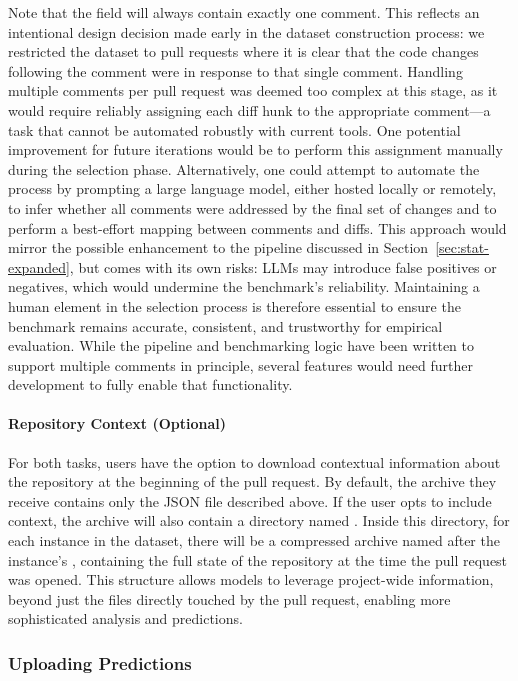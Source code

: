 Note that the  field will always contain exactly one comment. This reflects an
intentional design decision made early in the dataset construction process: we restricted the
dataset to pull requests where it is clear that the code changes following the comment were in
response to that single comment. Handling multiple comments per pull request was deemed too complex
at this stage, as it would require reliably assigning each diff hunk to the appropriate comment—a
task that cannot be automated robustly with current tools. One potential improvement for future
iterations would be to perform this assignment manually during the selection phase. Alternatively,
one could attempt to automate the process by prompting a large language model, either hosted locally
or remotely, to infer whether all comments were addressed by the final set of changes and to perform
a best-effort mapping between comments and diffs. This approach would mirror the possible
enhancement to the pipeline discussed in Section~\ref{sec:stat-expanded}, but comes with its own
risks: LLMs may introduce false positives or negatives, which would undermine the benchmark's
reliability. Maintaining a human element in the selection process is therefore essential to ensure
the benchmark remains accurate, consistent, and trustworthy for empirical evaluation. While the
pipeline and benchmarking logic have been written to support multiple comments in principle, several
features would need further development to fully enable that functionality.

\paragraph{Repository Context (Optional)}

For both tasks, users have the option to download contextual information about the repository at the
beginning of the pull request. By default, the archive they receive contains only the JSON file
described above. If the user opts to include context, the archive will also contain a directory
named . Inside this directory, for each instance in the dataset, there will be a
compressed archive named after the instance's , containing the full state of the repository
at the time the pull request was opened. This structure allows models to leverage project-wide
information, beyond just the files directly touched by the pull request, enabling more sophisticated
analysis and predictions.


\subsubsection{Uploading Predictions}
\label{sec:upload}

